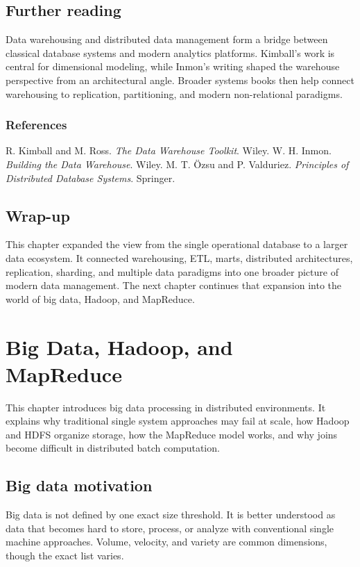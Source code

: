 \documentclass[11pt,a4paper,openany]{book}
\makeatletter
\renewenvironment{thebibliography}[1]
 {\subsection*{References}%
  \list{\@biblabel{\@arabic\c@enumiv}}%
   {\settowidth\labelwidth{\@biblabel{#1}}%
    \leftmargin\labelwidth\advance\leftmargin\labelsep
    \usecounter{enumiv}\let\p@enumiv\@empty
    \renewcommand\theenumiv{\@arabic\c@enumiv}}%
  \sloppy\clubpenalty4000\widowpenalty4000}
 {\endlist}
\makeatother
\begin{document}
\section{Further reading}
Data warehousing and distributed data management form a bridge between classical database systems and modern analytics platforms. Kimball's work is central for dimensional modeling, while Inmon's writing shaped the warehouse perspective from an architectural angle. Broader systems books then help connect warehousing to replication, partitioning, and modern non-relational paradigms.

\begin{thebibliography}{9}
R. Kimball and M. Ross.
\textit{The Data Warehouse Toolkit}. Wiley.
W. H. Inmon.
\textit{Building the Data Warehouse}. Wiley.
M. T. \"Ozsu and P. Valduriez.
\textit{Principles of Distributed Database Systems}. Springer.
\end{thebibliography}

\section{Wrap-up}
This chapter expanded the view from the single operational database to a larger data ecosystem. It connected warehousing, ETL, marts, distributed architectures, replication, sharding, and multiple data paradigms into one broader picture of modern data management. The next chapter continues that expansion into the world of big data, Hadoop, and MapReduce.

\chapter[Big Data, Hadoop, and MapReduce]{Big Data, Hadoop, and MapReduce}
\label{ch:bigdata}
\begin{guidancebox}
This chapter introduces big data processing in distributed environments. It explains why traditional single system approaches may fail at scale, how Hadoop and HDFS organize storage, how the MapReduce model works, and why joins become difficult in distributed batch computation.
\end{guidancebox}

\section{Big data motivation}
Big data is not defined by one exact size threshold. It is better understood as data that becomes hard to store, process, or analyze with conventional single machine approaches. Volume, velocity, and variety are common dimensions, though the exact list varies.
\end{document}
